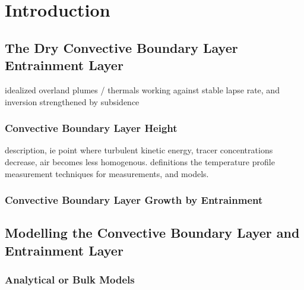 
\chapter{Introduction} 
\label{ch:Introduction}
\setlength{\parindent}{0cm}

\section{The Dry Convective Boundary Layer Entrainment Layer}
\label{sec:}

idealized
overland
plumes / thermals working against stable lapse rate, and inversion strengthened by subsidence


\subsection{Convective Boundary Layer Height}
\label{subsec:}

description, ie point where turbulent kinetic energy, tracer concentrations decrease, air becomes less homogenous.
definitions 
the temperature profile
measurement techniques for measurements, and models.

\subsection{Convective Boundary Layer Growth by Entrainment}
\label{subsec:}

\subsection{}
\label{subsec:}

\section{Modelling the Convective Boundary Layer and Entrainment Layer}
\label{sec:}

\subsection{Analytical or Bulk Models}
\label{subsec:}


